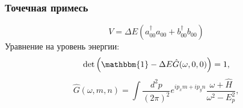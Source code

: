 \documentclass{beamer}
\begin{document}
\begin{frame}
    \frametitle{Точечная примесь}
    \begin{equation}
        V = \Delta E (a_{00}^\dagger a_{00} + b_{00}^\dagger b_{00})
    \end{equation}
    Уравнение на уровень энергии:
    \begin{equation}    
        \label{imp_equation}
        \det{\left(\mathbbm{1} - \Delta E \hat{G}(\omega, 0, 0)\right)} = 1,
    \end{equation}
    \begin{equation}    
        \label{green_function}
        \hat{G}(\omega, m, n) = \int \frac{d^2 p}{(2\pi)^2} e^{ip_x m + ip_y n}
                \frac{\omega + \hat{H}}{\omega^2 - E_p^2},
    \end{equation}
\end{frame}
\end{document}
